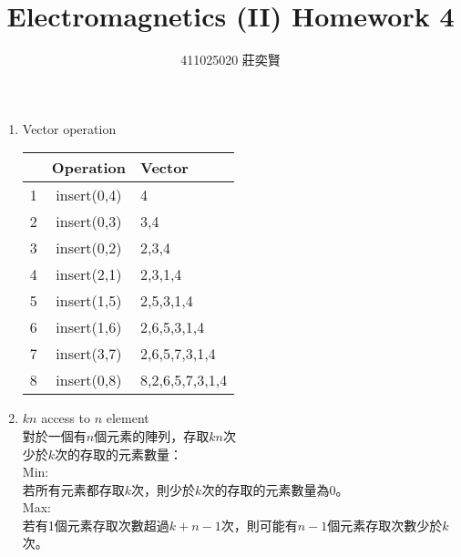 \documentclass[12pt,a4paper]{article}
\begin{document}
\begin{CJK*}{UTF8}{bsmi}
\title{Electromagnetics (II) Homework 4}
\author{411025020 莊奕賢}
\maketitle

\begin{enumerate}[1.]
    \item Vector operation
    \begin{center}
    \begin{tabular}{c|cl}
        & Operation & Vector \\ \hline\hline
    1 & insert(0,4)   & 4     \\ \hline
    2 & insert(0,3)   & 3,4   \\ \hline
    3 & insert(0,2)   & 2,3,4 \\ \hline
    4 & insert(2,1)   & 2,3,1,4 \\ \hline
    5 & insert(1,5)   & 2,5,3,1,4 \\ \hline
    6 & insert(1,6)   & 2,6,5,3,1,4 \\ \hline
    7 & insert(3,7)   & 2,6,5,7,3,1,4 \\ \hline
    8 & insert(0,8)   & 8,2,6,5,7,3,1,4 \\ \hline
    \end{tabular}
    \end{center}

    \item $kn$ access to $n$ element\\
    對於一個有$n$個元素的陣列，存取$kn$次 \\
    少於$k$次的存取的元素數量：\\
    \newline
    Min:\\
    若所有元素都存取$k$次，則少於$k$次的存取的元素數量為0。\\
    \newline
    Max:\\
    若有1個元素存取次數超過$k+n-1$次，則可能有$n-1$個元素存取次數少於$k$次。\\
\end{enumerate}

\end{CJK*}
\end{document}
